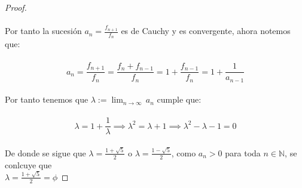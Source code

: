\documentclass[11pt,letterpaper]{article}
\newcommand{\N}{\mathbb{N}}
\begin{document}
\begin{proof}
\begin{equation*}
    \end{equation*}\,\\
    Por tanto la sucesi\'on $a_n=\frac{f_{n+1}}{f_n}$ es de Cauchy y es convergente, ahora notemos que:\,\\
    \,\\
    \begin{equation*}
        a_n=\frac{f_{n+1}}{f_n}=\frac{f_n+f_{n-1}}{f_n}=1+\frac{f_{n-1}}{f_n}=1+\frac{1}{a_{n-1}}
    \end{equation*}\,\\
    Por tanto tenemos que $\lambda:=\displaystyle\lim_{n\rightarrow \infty}\,a_n$ cumple que:\,\\
    \,\\
    \begin{equation*}
        \lambda=1+\frac{1}{\lambda}\implies \lambda^2=\lambda+1\implies \lambda^2-\lambda-1=0
    \end{equation*}\,\\
    De donde se sigue que $\lambda=\frac{1+\sqrt{5}}{2}$ o $\lambda=\frac{1-\sqrt{5}}{2}$, como $a_n>0$ para toda $n\in \N$, se conlcuye que \\$\lambda=\frac{1+\sqrt{5}}{2}=\phi$
\end{proof}
\end{document}
